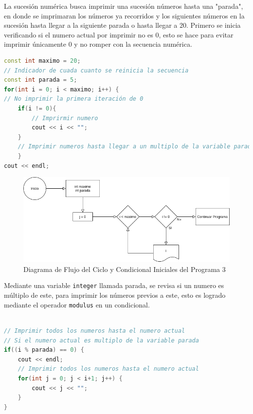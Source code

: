 \documentclass[12pt]{article}
\begin{document}
La sucesión numérica busca imprimir una sucesión números hasta una "parada", en donde se imprimaran los números ya recorridos y los siguientes números en la sucesión hasta llegar a la siguiente parada o hasta llegar a 20. Primero se inicia verificando si el numero actual por imprimir no es 0, esto se hace para evitar imprimir únicamente 0 y no romper con la secuencia numérica.

\begin{lstlisting}[language=c++]
const int maximo = 20;
// Indicador de cuada cuanto se reinicia la secuencia
const int parada = 5;
for(int i = 0; i < maximo; i++) {
// No imprimir la primera iteración de 0
    if(i != 0){
        // Imprirmir numero
        cout << i << "";
    }
    // Imprimir numeros hasta llegar a un multiplo de la variable parada
    }
cout << endl;
\end{lstlisting}

\begin{figure}[H]
    \caption{Diagrama de Flujo del Ciclo y Condicional Iniciales del Programa 3}
    \centering
    \includegraphics[scale=0.6]{programa3_ciclo1.png}
\end{figure}

\pagebreak

Mediante una variable \verb+integer+ llamada parada, se revisa si un numero es múltiplo de este, para imprimir los números previos a este, esto es logrado mediante el operador \verb+modulus+ en un condicional.

\begin{lstlisting}[language=c++]

// Imprimir todos los numeros hasta el numero actual
// Si el numero actual es multiplo de la variable parada
if((i % parada) == 0) {
    cout << endl;
    // Imprimir todos los numeros hasta el numero actual
    for(int j = 0; j < i+1; j++) {
        cout << j << "";
    }
} 
\end{lstlisting}
\end{document}
